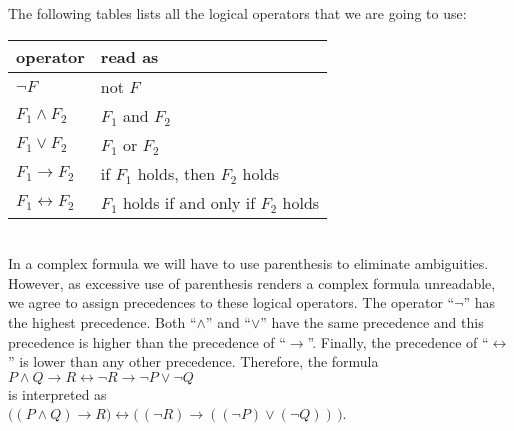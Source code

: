 \begin{enumerate}
      The following tables lists all the logical operators that we are going to use:
      \\[0.2cm]
      \hspace*{1.3cm}
      \hspace*{1.3cm} 
      \begin{tabular}{|l|l|}
      \hline
      operator & read as \\
      \hline
      \hline
        $\neg F$ & not $F$ \\
      \hline
        $F_1 \wedge F_2$ & $F_1$ and $F_2$ \\
      \hline
        $F_1 \vee F_2$ & $F_1$ or $F_2$ \\
      \hline
        $F_1 \rightarrow F_2$ & if $F_1$ holds, then $F_2$ holds \\
      \hline
        $F_1 \leftrightarrow F_2$ &  $F_1$ holds if and only if $F_2$ holds \\
      \hline
      \end{tabular}
      \\[0.2cm]
      In a complex formula we will have to use parenthesis to eliminate ambiguities.
      However, as excessive use of parenthesis renders a complex formula unreadable,
      we agree to assign precedences to these logical operators.  
      The operator  ``$\neg$'' has the highest precedence.  Both  ``$\wedge$''
      and ``$\vee$'' have the same precedence and this precedence is higher than the
      precedence of ``$\rightarrow$''.  Finally, the precedence of  ``$\leftrightarrow$'' 
      is lower than any other precedence.  Therefore, the formula
       \\[0.2cm]
      \hspace*{1.3cm} 
      $P \wedge Q \rightarrow R \leftrightarrow \neg R \rightarrow \neg P \vee \neg Q$ \\[0.2cm]
      is interpreted as  \\[0.2cm]
      \hspace*{1.3cm}  
      $\bigl((P \wedge Q) \rightarrow R\bigr) \leftrightarrow \bigl(\,(\neg R) \rightarrow ((\neg P) \vee (\neg Q))\,\bigr)$. 


\end{enumerate}
